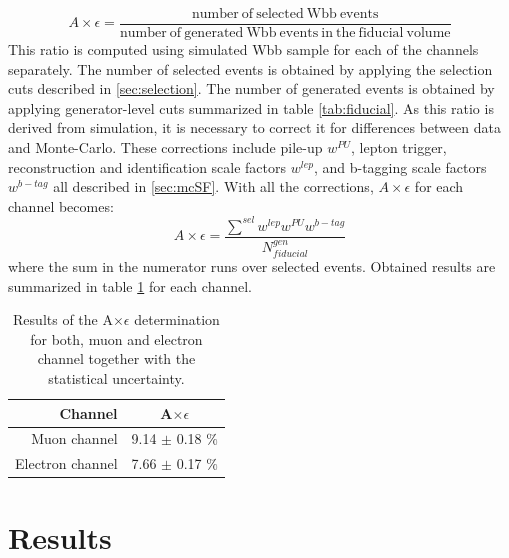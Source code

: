 \begin{equation}
A\times \epsilon=\frac{\mathrm{number\ of\ selected\ Wbb\ events}}{\mathrm{number\ of\ generated\ Wbb\ events\ in\ the\ fiducial\ volume}}
\end{equation}
This ratio is computed using simulated Wbb sample for each of the channels separately. The number of selected events is obtained by applying the selection cuts described in \ref{sec:selection}. The number of generated events is obtained by applying generator-level cuts summarized in table \ref{tab:fiducial}. As this ratio is derived from simulation, it is necessary to correct it for differences between data and Monte-Carlo. These corrections include pile-up  $w^{PU}$, lepton trigger, reconstruction and identification scale factors $w^{lep}$, and b-tagging scale factors $w^{b-tag}$ all described in \ref{sec:mcSF}. With all the corrections, $A\times \epsilon$ for each channel becomes:
\begin{equation}
A\times \epsilon = \frac{\sum^{sel} w^{lep} w^{PU} w^{b-tag}}{N_{fiducial}^{gen}}
\end{equation}
where the sum in the numerator runs over selected events.
Obtained results are summarized in table \ref{tab:AE} for each channel.

\begin{table}[!htb]
\begin{center}
   \begin{tabular} {r c} \hline \hline
        Channel         & A$\times \epsilon$ \\
        \hline
        Muon channel         & 9.14 $\pm$ 0.18 $\%$ \\
        Electron channel     & 7.66 $\pm$ 0.17 $\%$ \\
        \hline\hline
   \end{tabular}
\caption{Results of the A$\times \epsilon$ determination for both, muon and electron channel together with the statistical uncertainty.}
\label{tab:AE}
\end{center}
\end{table}




\section{Results}
\label{sec:res}

